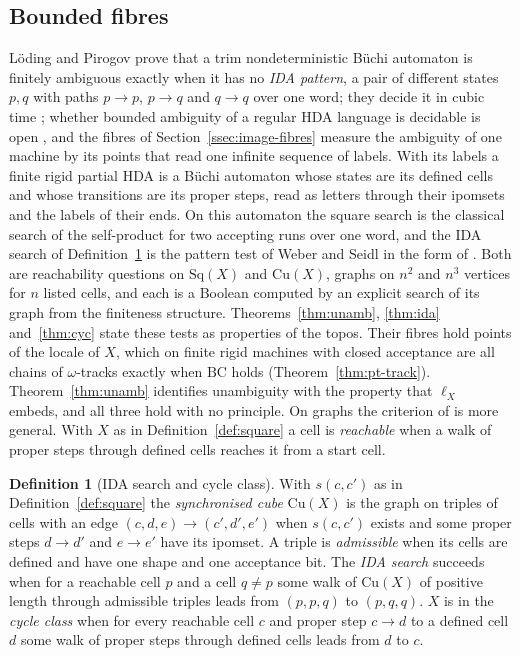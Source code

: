\documentclass{lmcs}
\theoremstyle{definition}
\newtheorem{definition}[theorem]{Definition}
\theoremstyle{remark}
\newcommand{\prin}[1]{\mathrm{#1}}
\providecommand{\Sq}[1]{\mathrm{Sq}(#1)}
\providecommand{\Cu}[1]{\mathrm{Cu}(#1)}
\providecommand{\BC}{\prin{BC}}
\providecommand{\BC}{\prin{BC}}
\begin{document}
\subsection{Bounded fibres}\label{ssec:image-bounded}

L\"oding and Pirogov prove that a trim nondeterministic B\"uchi automaton is finitely ambiguous exactly when it
has no \emph{IDA pattern}, a pair of different states $p,q$ with paths $p\to p$, $p\to q$ and $q\to q$ over one
word; they decide it in cubic time
\cite{LP18};
whether bounded ambiguity of a regular HDA language is decidable is open \cite{ABFZ23},
and the fibres of Section~\ref{ssec:image-fibres} measure the ambiguity of one machine by its points that read one
infinite sequence of labels.
With its labels a finite rigid partial HDA is a B\"uchi automaton whose states are its defined cells and whose
transitions are its proper steps, read as letters through their ipomsets and the labels of their ends. On this
automaton the square search is the classical search of the self-product for two accepting runs over one word, and the
IDA search of Definition~\ref{def:ida} is the pattern test of Weber and Seidl \cite{WS91} in the form of \cite{LP18}. Both are reachability
questions on $\Sq{X}$ and $\Cu{X}$, graphs on $n^2$ and $n^3$ vertices for $n$ listed cells, and each is a Boolean
computed by an explicit search of its graph from the finiteness structure. Theorems~\ref{thm:unamb}, \ref{thm:ida}
and~\ref{thm:cyc} state these tests as properties of the topos. Their fibres hold points of the locale of $X$, which on finite rigid
machines with closed acceptance are all chains of $\omega$-tracks exactly when $\BC$ holds
(Theorem~\ref{thm:pt-track}). Theorem~\ref{thm:unamb} identifies unambiguity with the property that $\ell_X$
embeds, and all three hold with no principle. On graphs the criterion of \cite{LP18} is more general. With $X$ as in Definition~\ref{def:square} a cell is \emph{reachable} when a walk of proper steps through defined cells reaches it from a
start cell.

\begin{definition}[IDA search and cycle class]\label{def:ida}\label{def:generate-cycle}
With $s(c,c')$ as in Definition~\ref{def:square} the \emph{synchronised cube} $\Cu{X}$ is the graph on
triples of cells with an edge $(c,d,e)\to(c',d',e')$ when $s(c,c')$ exists and some proper steps $d\to d'$
and $e\to e'$ have its ipomset. A triple is \emph{admissible} when its cells are defined
and have one shape and one acceptance bit. The \emph{IDA search} succeeds when for a reachable cell $p$
and a cell $q\neq p$ some walk of $\Cu{X}$ of positive length through admissible triples leads from $(p,p,q)$ to
$(p,q,q)$. $X$ is in the \emph{cycle class} when for every reachable cell
$c$ and proper step $c\to d$ to a defined cell $d$ some walk of proper steps through defined cells leads from $d$ to
$c$.
\end{definition}
\end{document}
